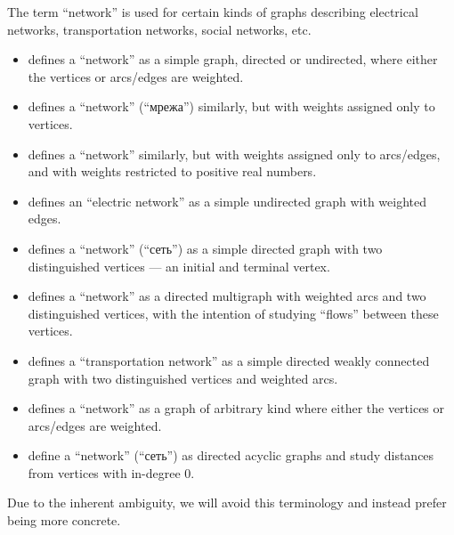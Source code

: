 \begin{remark}\label{rem:graph_network_terminology}
  The term \enquote{network} is used for certain kinds of graphs describing electrical networks, transportation networks, social networks, etc.

  \begin{itemize}
    \item \Textcite[655]{Knuth1997ArtVol1} defines a \enquote{network} as a simple graph, directed or undirected, where either the vertices or arcs/edges are weighted.

    \item \Textcite[13]{Мирчев2001Графи} defines a \enquote{network} (\enquote{мрежа}) similarly, but with weights assigned only to vertices.

    \item \Textcite[62]{Harary1969GraphTheory} defines a \enquote{network} similarly, but with weights assigned only to arcs/edges, and with weights restricted to positive real numbers.

    \item \Textcite[54]{Bollobás1998ModernGraphTheory} defines an \enquote{electric network} as a simple undirected graph with weighted edges.

    \item \Textcite[\S 7.3.3]{Новиков2013ДискретнаяМатематика} defines a \enquote{network} (\enquote{сеть}) as a simple directed graph with two distinguished vertices --- an initial and terminal vertex.

    \item \Textcite[151]{Diestel2017GraphTheory} defines a \enquote{network} as a directed multigraph with weighted arcs and two distinguished vertices, with the intention of studying \enquote{flows} between these vertices.

    \item \Textcite[def. 6.8.1]{Knauer2019AlgebraicGraphTheory} defines a \enquote{transportation network} as a simple directed weakly connected graph with two distinguished vertices and weighted arcs.

    \item \Textcite[655]{Knuth1997ArtVol1} defines a \enquote{network} as a graph of arbitrary kind where either the vertices or arcs/edges are weighted.

    \item \Textcite[def. 5.17]{БелоусовТкачёв2004ДискретнаяМатематика} define a \enquote{network} (\enquote{сеть}) as directed acyclic graphs and study distances from vertices with in-degree \( 0 \).
  \end{itemize}

  Due to the inherent ambiguity, we will avoid this terminology and instead prefer being more concrete.
\end{remark}


